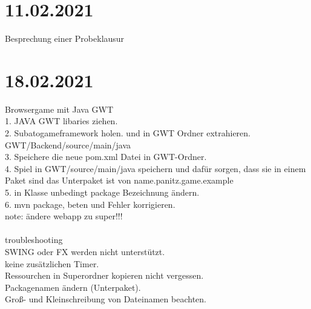 \documentclass{article}
\begin{document}
	\section*{11.02.2021}
	Besprechung einer Probeklausur \\
	\section*{18.02.2021}
	Browsergame mit Java GWT\\
	1. JAVA GWT libaries ziehen. \\
	2. Subatogameframework holen. und in GWT Ordner extrahieren. GWT/Backend/source/main/java \\
	3. Speichere die neue pom.xml Datei in GWT-Ordner. \\
	4. Spiel in GWT/source/main/java speichern und dafür sorgen, dass sie in einem Paket sind das Unterpaket ist von name.panitz.game.example \\
	5. in Klasse unbedingt package Bezeichnung ändern. \\
	6. mvn package, beten und Fehler korrigieren. \\
	note: ändere webapp zu super!!! \\
	\\
	troubleshooting \\
	SWING oder FX werden nicht unterstützt. \\
	keine zusätzlichen Timer. \\
	Ressourchen in Superordner kopieren nicht vergessen. \\
	Packagenamen ändern (Unterpaket). \\
	Groß- und Kleinschreibung von Dateinamen beachten. \\
	
\end{document}
